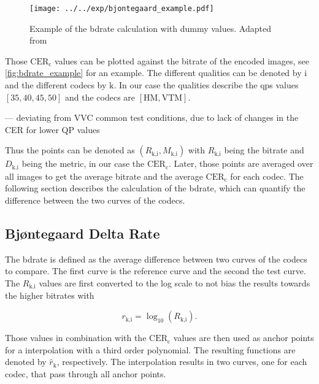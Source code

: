 \begin{figure}
    \centering
    \texttt{[image: ../../exp/bjontegaard\_example.pdf]}
    \caption{Example of the \gls{bdrate} calculation with dummy values. Adapted from \cite{bdrate_beyond_2022}}
    \label{fig:bdrate_example}
\end{figure}

Those $\text{CER}_{\text{c}}$ values can be plotted against the bitrate of the encoded images, see \autoref{fig:bdrate_example} for an example.
The different qualities can be denoted by $\text{i}$ and the different codecs by $\text{k}$.
In our case the qualities describe the \glspl{qp} values $[35, 40, 45, 50]$ and the codecs are $[\text{HM}, \text{VTM}]$.

--- deviating from VVC common test conditions, due to lack of changes in the CER for lower QP values

Thus the points can be denoted as $\left(R_{\text{k,i}}, M_{\text{k,i}}\right)$ with $R_{\text{k,i}}$ being the bitrate and $D_{\text{k,i}}$ being the metric, in our case the $\text{CER}_{\text{c}}$.
Later, those points are averaged over all images to get the average bitrate and the average $\text{CER}_{\text{c}}$ for each codec.
The following section describes the calculation of the \gls{bdrate}, which can quantify the difference between the two curves of the codecs.

\subsection{Bjøntegaard Delta Rate}
\label{subsec:bdrate}

The \gls{bdrate} \cite{bdrate_original_2001}\cite{bdrate_beyond_2022} is defined as the average difference between two curves of the codecs to compare.
The first curve is the reference curve and the second the test curve.
The $R_{\text{k,i}}$ values are first converted to the log scale to not bias the results towards the higher bitrates with

\begin{equation}
    r_{\text{k,i}} = \log_{10}\left(R_{\text{k,i}}\right).
    \label{eq:log_scale}
\end{equation}

Those values in combination with the $\text{CER}_{\text{c}}$ values are then used as anchor points for a interpolation with a third order polynomial.
The resulting functions are denoted by $\hat{r}_{\text{k}}$, respectively.
The interpolation results in two curves, one for each codec, that pass through all anchor points.

